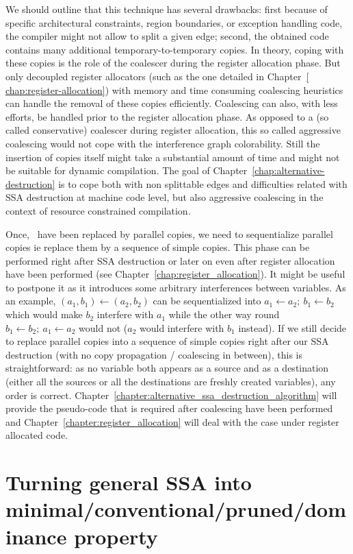 We should outline that this technique has several drawbacks: first because of specific architectural constraints, region boundaries, or exception handling code, the compiler might not allow to split a given edge; second, the obtained code contains many additional temporary-to-temporary copies. In theory, coping with these copies is the role of the coalescer during the register allocation phase. But only decoupled register allocators (such as the one detailed in Chapter~\ref{ chap:register-allocation}) with memory and time consuming coalescing heuristics can handle the removal of these copies efficiently. Coalescing can also, with less efforts, be handled prior to the register allocation phase. As opposed to a (so called conservative) coalescer during register allocation, this so called aggressive coalescing would not cope with the interference graph colorability. Still the insertion of copies itself might take a substantial amount of time and might not be suitable for dynamic compilation. The goal of Chapter~\ref{chap:alternative-destruction} is to cope both with non splittable edges and difficulties related with SSA destruction at machine code level, but also aggressive coalescing in the context of resource constrained compilation.

Once, \phiops\ have been replaced by parallel copies, we need to sequentialize parallel copies ie replace them by a sequence of simple copies. This phase can be performed right after SSA destruction or later on even after register allocation have been performed (see Chapter~\ref{chap:register_allocation}). It might be useful to postpone it as it introduces some arbitrary interferences between variables. As an example, $(a_1,b_1)\gets (a_2,b_2)$ can be sequentialized into $a_1\gets a_2;\ b_1\gets b_2$ which would make $b_2$ interfere with $a_1$ while the other way round $b_1\gets b_2;\ a_1\gets a_2$ would not ($a_2$ would interfere with $b_1$ instead).
If we still decide to replace parallel copies into a sequence of simple copies right after our SSA destruction (with no copy propagation / coalescing in between), this is straightforward: as no variable both appears as a source and as a destination (either all the sources or all the destinations are freshly created variables), any order is correct. Chapter~\ref{chapter:alternative_ssa_destruction_algorithm} will provide the pseudo-code that is required after coalescing have been performed and Chapter~\ref{chapter:register_allocation} will deal with the case under register allocated code.

\section{Turning general SSA into minimal/conventional/pruned/dominance property}

